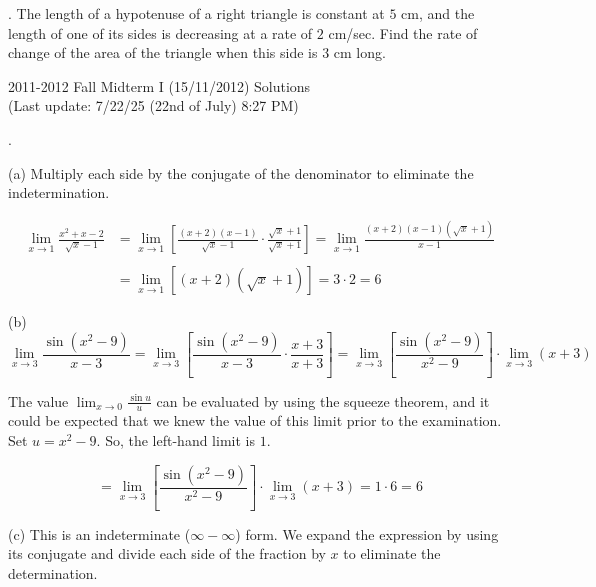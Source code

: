 \documentclass{article}
\begin{document}
\hfill

. The length of a hypotenuse of a right triangle is constant at $5$ cm, and the
length of one of its sides is decreasing at a rate of $2$ cm/sec. Find the rate of change of the area of the triangle when this side is $3$ cm long.

\newpage

\begin{center}
2011-2012 Fall Midterm I (15/11/2012) Solutions\\
(Last update: 7/22/25 (22nd of July) 8:27 PM)
\end{center}

.

\hfill

\noindent (a) Multiply each side by the conjugate of the denominator to eliminate the indetermination.

\begin{align*}
\lim_{x\to1}\frac{x^2+x-2}{\sqrt x -1}&=\lim_{x\to1}\left[\frac{(x+2)(x-1)}{\sqrt x -1}\cdot \frac{\sqrt x + 1}{\sqrt x +1}\right]=\lim_{x\to1}\frac{(x+2)(x-1)\left(\sqrt x + 1\right)}{x-1}\\\\&=\lim_{x\to1}\left[(x+2)\left(\sqrt x + 1\right)\right] =3\cdot 2 = \boxed6
\end{align*}

\hfill

\noindent (b)
\begin{equation*}
\lim_{x\to 3}\frac{\sin(x^2-9)}{x-3}=\lim_{x\to 3}\left[\frac{\sin(x^2-9)}{x-3}\cdot\frac{x+3}{x+3}\right]=\lim_{x\to3}\left[\frac{\sin(x^2-9)}{x^2-9}\right]\cdot\lim_{x\to 3}(x+3)
\end{equation*}

\hfill

\noindent The value $\displaystyle \lim_{x\to0}\frac{\sin u}{u}$ can be evaluated by using the squeeze theorem, and it could be expected that we knew the value of this limit prior to the examination. Set $u=x^2-9$. So, the left-hand limit is $1$.

\begin{equation*}
=\lim_{x\to3}\left[\frac{\sin(x^2-9)}{x^2-9}\right]\cdot\lim_{x\to 3}(x+3) = 1\cdot 6 = \boxed6
\end{equation*}

\hfill

\noindent (c) This is an indeterminate ($\infty - \infty$) form. We expand the expression by using its conjugate and divide each side of the fraction by $x$ to eliminate the determination.
\end{document}
